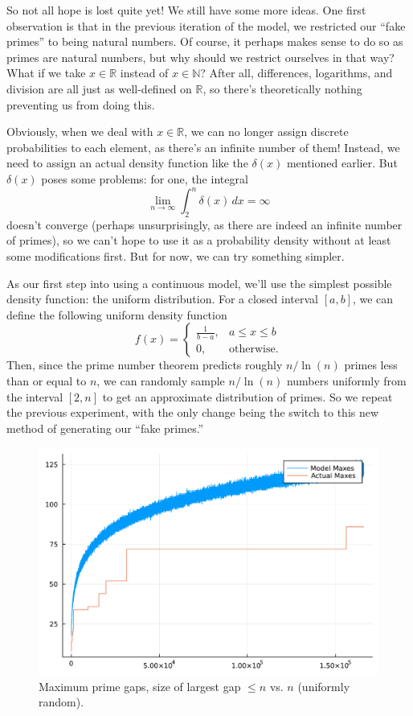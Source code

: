 \documentclass[conference]{IEEEtran}
\begin{document}
So not all hope is lost quite yet! We still have some more ideas.
One first observation is that in the previous iteration of the model,
we restricted our ``fake primes'' to being natural numbers. Of course,
it perhaps makes sense to do so as primes are natural numbers, but
why should we restrict ourselves in that way? What if we take $x \in \mathbb{R}$
instead of $x \in \mathbb{N}$? After all, differences, logarithms, and
division are all just as well-defined on $\mathbb{R}$, so there's theoretically
nothing preventing us from doing this.

Obviously, when we deal with $x \in \mathbb{R}$, we can
no longer assign discrete probabilities to each element,
as there's an infinite number of them! Instead, we need
to assign an actual density function like the $\delta(x)$
mentioned earlier. But $\delta(x)$ poses some problems:
for one, the integral
\[\lim_{n \to \infty} \int_2^n \delta(x)\, dx = \infty\]
doesn't converge (perhaps unsurprisingly, as there are
indeed an infinite number of primes), so we can't hope to
use it as a probability density without at least some
modifications first. But for now, we can try something
simpler.

As our first step into using a continuous model, we'll
use the simplest possible density function: the uniform
distribution. For a closed interval $[a, b]$, we can
define the following uniform density function
\[f(x) = \begin{cases}\frac{1}{b-a}, & a \le x \le b \\ 0, & \text{otherwise}.\end{cases}\]
Then, since the prime number theorem predicts roughly
$n/\ln(n)$ primes less than or equal to $n$, we can
randomly sample $n/\ln(n)$ numbers uniformly from the
interval $[2, n]$ to get an approximate distribution of
primes. So we repeat the previous experiment, with the
only change being the switch to this new method of
generating our ``fake primes.''

\begin{figure}[H]
  \centering
  \includegraphics[width=\linewidth,keepaspectratio]{random-plot-with-reals.pdf}
  \caption{Maximum prime gaps, size of largest gap $\le n$ vs. $n$ (uniformly random).}
\end{figure}
\end{document}
